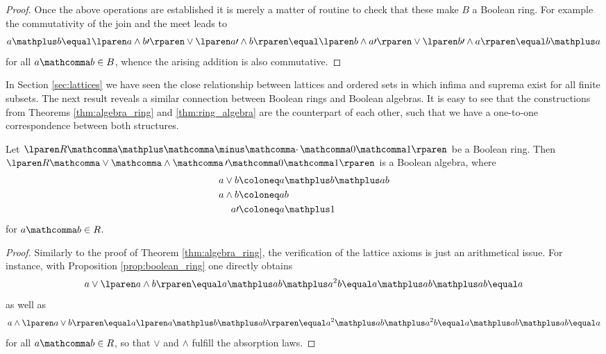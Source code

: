 \begin{proof}
  Once the above operations are established
  it is merely a matter of routine to check that these make $B$ a Boolean ring.
  For example the commutativity of the join and the meet leads to
  \[
    a \mathplus b
    \equal
    \lparen a \wedge b \prime \rparen \vee \lparen a \prime \wedge b \rparen
    \equal
    \lparen b \wedge a \prime \rparen \vee \lparen b \prime \wedge a \rparen
    \equal
    b \mathplus a
  \]
  for all $a \mathcomma b \in B$,
  whence the arising addition is also commutative.
\end{proof}

\medskip

In Section \ref{sec:lattices} we have seen the close relationship
between lattices
and ordered sets in which infima and suprema exist for all finite subsets.
The next result reveals a similar connection
between Boolean rings and Boolean algebras.
It is easy to see that the constructions
from Theorems \ref{thm:algebra_ring} and \ref{thm:ring_algebra}
are the counterpart of each other,
such that we have a one-to-one correspondence between both structures.

\medskip

\begin{theorem}
\label{thm:ring_algebra}
  Let
  $\lparen R \mathcomma \mathplus \mathcomma \minus \mathcomma \cdotp
  \mathcomma 0 \mathcomma 1 \rparen$
  be a Boolean ring.
  Then
  $\lparen R \mathcomma \vee \mathcomma \wedge \mathcomma \, \prime
  \mathcomma 0 \mathcomma 1 \rparen$
  is a Boolean algebra,
  where
  \begin{align*}
    a \vee b
    &\coloneq
    a \mathplus b \mathplus ab \\
    a \wedge b
    &\coloneq
    ab \\
    a \prime
    &\coloneq
    a \mathplus 1
  \end{align*}
  for $a \mathcomma b \in R$.
\end{theorem}

\begin{proof}
  Similarly to the proof of Theorem \ref{thm:algebra_ring},
  the verification of the lattice axioms is just an arithmetical issue.
  For instance, with Proposition \ref{prop:boolean_ring} one directly obtains
  \[
    a \vee \lparen a \wedge b \rparen
    \equal
    a \mathplus ab \mathplus a^2 b
    \equal
    a \mathplus ab \mathplus ab
    \equal
    a
  \]
  as well as
  \[
    a \wedge \lparen a \vee b \rparen
    \equal
    a \lparen a \mathplus b \mathplus ab \rparen
    \equal
    a^2 \mathplus ab \mathplus a^2b
    \equal
    a \mathplus ab \mathplus ab
    \equal
    a
  \]
  for all $a \mathcomma b \in R$,
  so that $\vee$ and $\wedge$ fulfill the absorption laws.
\end{proof}

